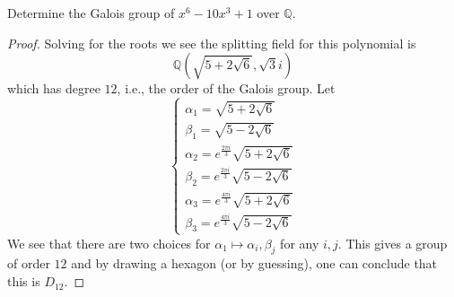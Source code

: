 \documentclass[openany]{book}
\newcommand{\Q}{\mathbb{Q}}
\begin{document}
\begin{prob}
    Determine the Galois group of \(x^{6}-10x^{3}+1\) over \(\mathbb{Q}\).
\end{prob}
\begin{proof}
    Solving for the roots we see the splitting field for this polynomial is 
    \begin{equation*}
        \Q(\sqrt{5+2\sqrt{6}},\sqrt{3}i)
    \end{equation*}
    which has degree $12$, i.e., the order of the Galois group. Let 
    \begin{equation*}
        \begin{cases}
            \alpha_1=\sqrt{5+2\sqrt{6}}\\
            \beta_1=\sqrt{5-2\sqrt{6}}\\
            \alpha_2=e^\frac{2\pi i}{3}\sqrt{5+2\sqrt{6}}\\
            \beta_2=e^\frac{2\pi i}{3}\sqrt{5-2\sqrt{6}}\\
            \alpha_3=e^\frac{4\pi i}{3}\sqrt{5+2\sqrt{6}}\\
            \beta_3=e^\frac{4\pi i}{3}\sqrt{5-2\sqrt{6}}
        \end{cases}
    \end{equation*}
    We see that there are two choices for $\alpha_1\mapsto \alpha_i,\beta_j$ for any $i,j$. This gives a group of order $12$ and by drawing a hexagon (or by guessing), one can conclude that this is $D_{12}$.
\end{proof}
\end{document}
